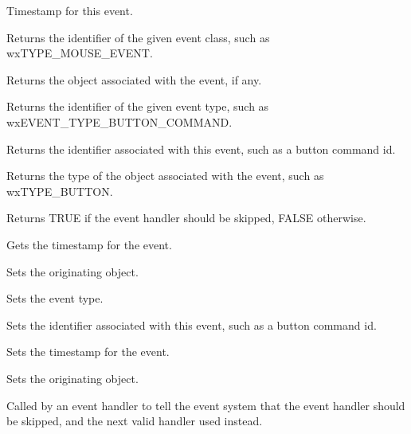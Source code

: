 Timestamp for this event.



Returns the identifier of the given event class,
such as wxTYPE\_MOUSE\_EVENT.



Returns the object associated with the
event, if any.



Returns the identifier of the given event type,
such as wxEVENT\_TYPE\_BUTTON\_COMMAND.



Returns the identifier associated with this event, such as a button command id.



Returns the type of the object associated with the
event, such as wxTYPE\_BUTTON.



Returns TRUE if the event handler should be skipped, FALSE otherwise.



Gets the timestamp for the event.



Sets the originating object.



Sets the event type.



Sets the identifier associated with this event, such as a button command id.



Sets the timestamp for the event.

Sets the originating object.

\label{wxeventskip}


Called by an event handler to tell the event system that the
event handler should be skipped, and the next valid handler used
instead.

